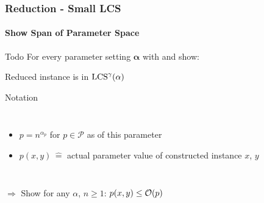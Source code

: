 \begin{frame}
\frametitle{Reduction - Small LCS}
\framesubtitle{Show Span of Parameter Space}

\begin{alertblock}{Todo}
    For every parameter setting $\mathbf{\alpha}$ with  and  show:
    
    Reduced instance is in $\text{LCS}^\gamma(\mathbb{\alpha})$
\end{alertblock}


\pause

\begin{exampleblock}{Notation}
    \begin{columns}
	\begin{itemize}
		\item $p = n^{\alpha_p}$ for $p \in \mathcal{P}$ as  of this parameter
		\item $p(x,y)\, \hat{=}$ actual parameter value of constructed instance $x$, $y$
	\end{itemize}
    \end{columns}

	\vspace{2ex}    
    
    $\Rightarrow$ Show for any $\alpha$, $n \geq 1$: \quad\quad\quad $p(x,y) \leq \mathcal{O}(p)$
\end{exampleblock}

\end{frame}











